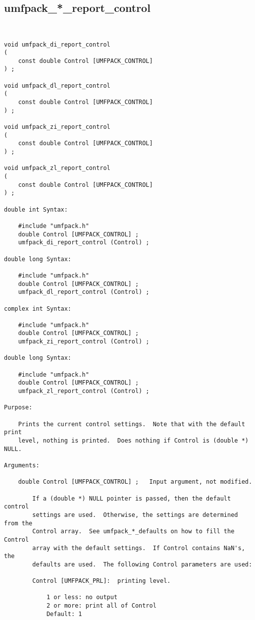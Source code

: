 \newpage
\subsection{umfpack\_*\_report\_control}

{\footnotesize
\begin{verbatim}


void umfpack_di_report_control
(
    const double Control [UMFPACK_CONTROL]
) ;

void umfpack_dl_report_control
(
    const double Control [UMFPACK_CONTROL]
) ;

void umfpack_zi_report_control
(
    const double Control [UMFPACK_CONTROL]
) ;

void umfpack_zl_report_control
(
    const double Control [UMFPACK_CONTROL]
) ;

double int Syntax:

    #include "umfpack.h"
    double Control [UMFPACK_CONTROL] ;
    umfpack_di_report_control (Control) ;

double long Syntax:

    #include "umfpack.h"
    double Control [UMFPACK_CONTROL] ;
    umfpack_dl_report_control (Control) ;

complex int Syntax:

    #include "umfpack.h"
    double Control [UMFPACK_CONTROL] ;
    umfpack_zi_report_control (Control) ;

double long Syntax:

    #include "umfpack.h"
    double Control [UMFPACK_CONTROL] ;
    umfpack_zl_report_control (Control) ;

Purpose:

    Prints the current control settings.  Note that with the default print
    level, nothing is printed.  Does nothing if Control is (double *) NULL.

Arguments:

    double Control [UMFPACK_CONTROL] ;   Input argument, not modified.

        If a (double *) NULL pointer is passed, then the default control
        settings are used.  Otherwise, the settings are determined from the
        Control array.  See umfpack_*_defaults on how to fill the Control
        array with the default settings.  If Control contains NaN's, the
        defaults are used.  The following Control parameters are used:

        Control [UMFPACK_PRL]:  printing level.

            1 or less: no output
            2 or more: print all of Control
            Default: 1
\end{verbatim}
}

